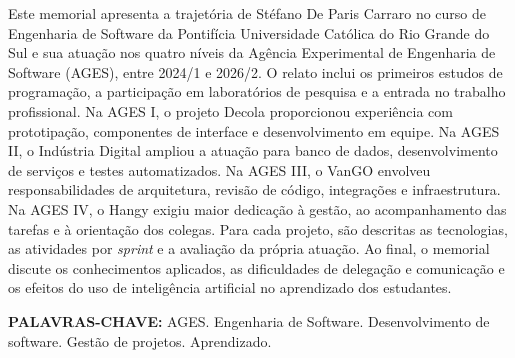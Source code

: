 \begin{resumo}
Este memorial apresenta a trajetória de Stéfano De Paris Carraro no curso de
Engenharia de Software da Pontifícia Universidade Católica do Rio Grande do
Sul e sua atuação nos quatro níveis da Agência Experimental de Engenharia
de Software (AGES), entre 2024/1 e 2026/2. O relato inclui os primeiros
estudos de programação, a participação em laboratórios de pesquisa e a
entrada no trabalho profissional. Na AGES I, o projeto Decola proporcionou
experiência com prototipação, componentes de interface e desenvolvimento em
equipe. Na AGES II, o Indústria Digital ampliou a atuação para banco de
dados, desenvolvimento de serviços e testes automatizados. Na AGES III,
o VanGO envolveu responsabilidades de arquitetura, revisão de código,
integrações e infraestrutura. Na AGES IV, o Hangy exigiu maior dedicação à
gestão, ao acompanhamento das tarefas e à orientação dos colegas. Para
cada projeto, são descritas as tecnologias, as atividades por \textit{sprint} e a
avaliação da própria atuação. Ao final, o memorial discute os conhecimentos
aplicados, as dificuldades de delegação e comunicação e os efeitos do uso
de inteligência artificial no aprendizado dos estudantes.

\vspace{\baselineskip}
\noindent\textbf{PALAVRAS-CHAVE:} AGES. Engenharia de Software.
Desenvolvimento de software. Gestão de projetos. Aprendizado.
\end{resumo}
